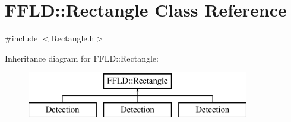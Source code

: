 \hypertarget{class_f_f_l_d_1_1_rectangle}{\section{F\-F\-L\-D\-:\-:Rectangle Class Reference}
\label{class_f_f_l_d_1_1_rectangle}
}


{\ttfamily \#include $<$Rectangle.\-h$>$}

Inheritance diagram for F\-F\-L\-D\-:\-:Rectangle\-:\begin{figure}[H]
\begin{center}
\leavevmode
\includegraphics[height=2.000000cm]{class_f_f_l_d_1_1_rectangle}
\end{center}
\end{figure}

